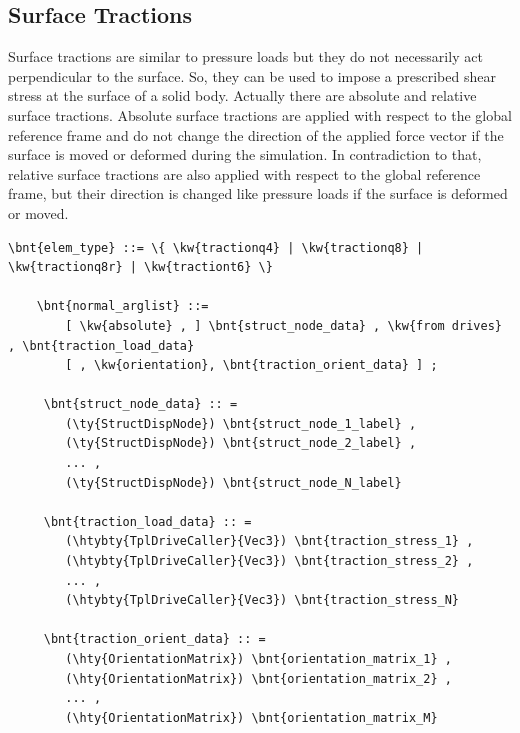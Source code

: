 \subsection{Surface Tractions}
Surface tractions are similar to pressure loads but they do not necessarily act perpendicular to the surface.
So, they can be used to impose a prescribed shear stress at the surface of a solid body.
Actually there are absolute and relative surface tractions. Absolute surface tractions are applied with respect
to the global reference frame and do not change the direction of the applied force vector if the surface is moved
or deformed during the simulation. In contradiction to that, relative surface tractions are also applied with respect
to the global reference frame, but their direction is changed like pressure loads if the surface is deformed or moved.
\begin{Verbatim}[commandchars=\\\{\}]
  \bnt{elem_type} ::= \{ \kw{tractionq4} | \kw{tractionq8} | \kw{tractionq8r} | \kw{tractiont6} \}

    \bnt{normal_arglist} ::=
        [ \kw{absolute} , ] \bnt{struct_node_data} , \kw{from drives} , \bnt{traction_load_data}
        [ , \kw{orientation}, \bnt{traction_orient_data} ] ;

     \bnt{struct_node_data} :: =
        (\ty{StructDispNode}) \bnt{struct_node_1_label} ,
        (\ty{StructDispNode}) \bnt{struct_node_2_label} ,
        ... ,
        (\ty{StructDispNode}) \bnt{struct_node_N_label}

     \bnt{traction_load_data} :: =
        (\htybty{TplDriveCaller}{Vec3}) \bnt{traction_stress_1} ,
        (\htybty{TplDriveCaller}{Vec3}) \bnt{traction_stress_2} ,
        ... ,
        (\htybty{TplDriveCaller}{Vec3}) \bnt{traction_stress_N}

     \bnt{traction_orient_data} :: =
        (\hty{OrientationMatrix}) \bnt{orientation_matrix_1} ,
        (\hty{OrientationMatrix}) \bnt{orientation_matrix_2} ,
        ... ,
        (\hty{OrientationMatrix}) \bnt{orientation_matrix_M}
\end{Verbatim}

